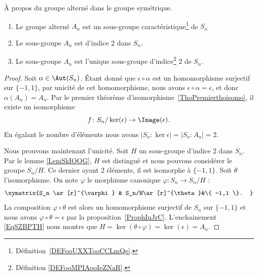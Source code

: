 \begin{proposition} \label{PROPooCPXOooVxPAij}
    À propos du groupe alterné dans le groupe symétrique.
    \begin{enumerate}
        \item
            Le groupe alterné \( A_n\) est un sous-groupe caractéristique\footnote{Définition~\ref{DEFooUXXTooCCLmQe}.} de \( S_n\)
        \item   \label{ITEMooWXXUooOWvFgE}
            Le sous-groupe \( A_n\) est d'indice \( 2\) dans \( S_n\).
        \item       \label{ITEMooGGAHooRYgNqq}
            Le sous-groupe \( A_n\) est l'unique sous-groupe d'indice\footnote{Définition \ref{DEFooMPIAooIeZNaR}.} \( 2\) de \( S_n\).
    \end{enumerate}
\end{proposition}

\begin{proof}
    Soit \( \alpha\in \Aut(S_n)\). Étant donné que \( \epsilon\circ\alpha\) est un homomorphisme surjectif sur \( \{ -1,1 \}\), par unicité de cet homomorphisme, nous avons \( \epsilon\circ\alpha=\epsilon\), et donc \( \alpha(A_n)=A_n\). Par le premier théorème d'isomorphisme~\ref{ThoPremierthoisomo}, il existe un isomorphisme
    \begin{equation}
        f\colon S_n/\ker(\epsilon)\to \Image(\epsilon).
    \end{equation}
    En égalant le nombre d'éléments nous avons \( | S_n:\ker\epsilon |=| S_n:A_n |=2\).

    Nous prouvons maintenant l'unicité. Soit \( H\) un sous-groupe d'indice \( 2\) dans \( S_n\). Par le lemme \ref{LemSkIOOG}, \( H\) est distingué et nous pouvons considérer le groupe \( S_n/H\). Ce dernier ayant \( 2\) éléments, il est isomorphe à \( \{ -1,1 \}\). Soit \( \theta\) l'isomorphisme. On note \( \varphi\) le morphisme canonique \( \varphi\colon S_n\to S_n/H\) :
    \begin{equation}    \label{EqSZBPTH}
        \xymatrix{%
        S_n \ar[r]^{\varphi}        &   S_n/H\ar[r]^{\theta}&\{ -1,1 \}.
           }
    \end{equation}
    La composition \( \varphi\circ \theta\) est alors un homomorphisme surjectif de \( S_n\) sur \( \{ -1,1 \}\) et nous avons \( \varphi\circ\theta=\epsilon\) par la proposition~\ref{ProphIuJrC}. L'enchainement \eqref{EqSZBPTH} nous montre que \( H=\ker(\theta\circ\varphi)=\ker(\epsilon)=A_n\).
\end{proof}

